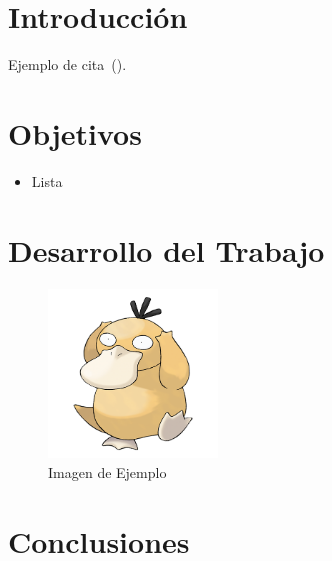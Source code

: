 \setcounter{page}{1}


\section{Introducción}
    Ejemplo de cita~(\cite{buffett84}).
\section{Objetivos}
    \begin{itemize}
        \item Lista
    \end{itemize}

\section{Desarrollo del Trabajo}

    \begin{figure}[H]
        \centering
        \includegraphics[width=0.4\textwidth]{img/prueba.png}
        \caption{Imagen de Ejemplo}
        \label{fig:Imagen_Ejemplo}
    \end{figure}


\section{Conclusiones}

